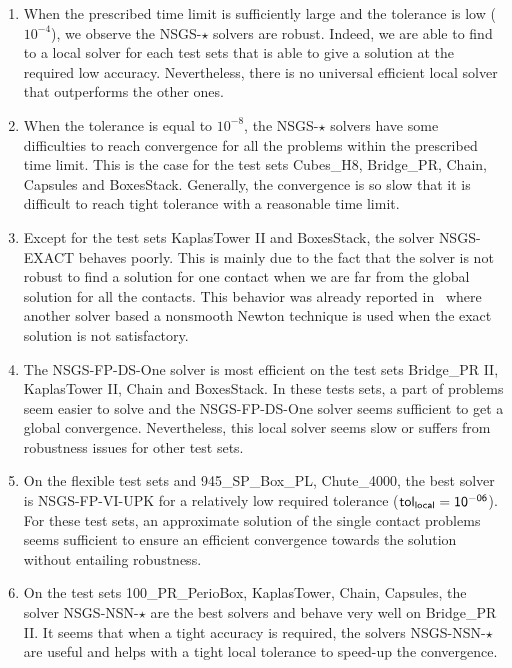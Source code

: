 \begin{enumerate}
\item When the prescribed time limit is sufficiently large and the tolerance is low ($10^{-4}$), we observe the {\sf NSGS-$\star$} solvers are robust. Indeed, we are able to find to a local solver for each test sets that is able to give a solution at the required low accuracy. Nevertheless, there is no universal efficient local solver that outperforms the other ones.
  
\item When the tolerance is equal to $10^{-8}$,  the {\sf NSGS-$\star$} solvers have some difficulties to reach convergence for all the problems within the prescribed time limit. This is the case for the test sets Cubes\_H8, Bridge\_PR, Chain,  Capsules and BoxesStack. Generally, the convergence is so slow that it is difficult to reach tight tolerance with a reasonable time limit.
 
\item Except for the test sets KaplasTower II and BoxesStack, the solver {\sf NSGS-EXACT} behaves poorly. This is mainly due to the fact that the solver is not robust to find a solution for one contact when we are far from the global solution for all the contacts. This behavior was already reported in~\citep{Daviet.ea_SIGGRAPH2011} where another solver based a nonsmooth Newton technique is used when  the exact solution is not satisfactory.
  
\item  The {\sf NSGS-FP-DS-One} solver  is most efficient on the test sets Bridge\_PR II, KaplasTower II, Chain and BoxesStack. In these tests sets, a part of problems seem easier to solve and the {\sf NSGS-FP-DS-One} solver seems sufficient to get a global convergence.
  Nevertheless, this local solver seems slow or suffers from robustness issues for other test sets.
  
\item On the flexible test sets and 945\_SP\_Box\_PL, Chute\_4000, the best solver is {\sf NSGS-FP-VI-UPK} for a relatively low required tolerance ($\sf tol_{local} =10^{-06}$). For these test sets, an approximate solution of the single contact problems seems sufficient to ensure an efficient convergence towards the solution without entailing robustness.
  
\item On the test sets 100\_PR\_PerioBox, KaplasTower,  Chain, Capsules, the solver {\sf NSGS-NSN-$\star$} are the best solvers and behave very well on Bridge\_PR II. It seems that when a tight accuracy is required, the solvers {\sf NSGS-NSN-$\star$} are useful and helps with a tight local tolerance to speed-up the convergence.
  

\end{enumerate}
